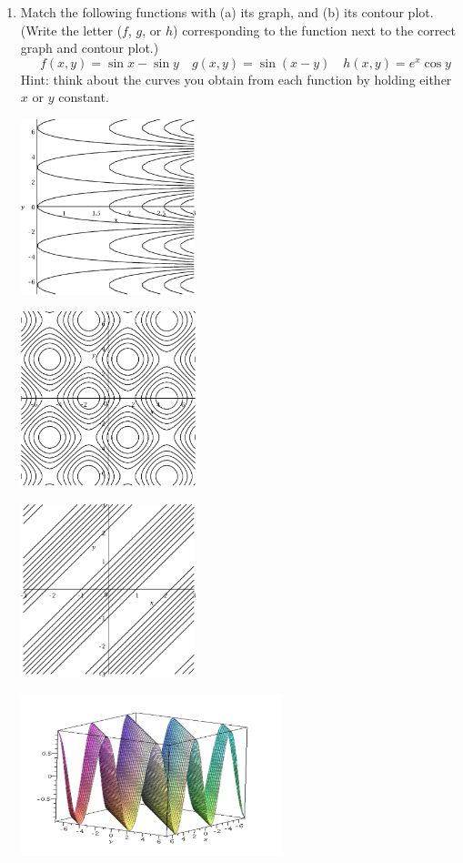 \documentclass[12pt]{article}
\newcommand{\points}[1]{\marginpar{\hspace{24pt}[#1]}}
\begin{document}
\begin{enumerate}
\item Match the following functions with (a) its graph, and (b) its contour plot. (Write the letter ($f$, $g$, or $h$) corresponding to the function next to the correct graph and contour plot.)\points{6}
\[
 \quad f(x,y) = \sin x-\sin y \quad g(x,y) = \sin(x-y) \quad h(x,y) = e^x\cos y 
\]
Hint: think about the curves you obtain from each function by holding either $x$ or $y$ constant.

\begin{multicols}{2}
 \includegraphics[width=2in]{T1ccont}

 \includegraphics[width=2in]{T1dcont}

 \includegraphics[width=2in]{T1bcont}

\columnbreak

 \includegraphics[width=3in]{T1bsurf}


\end{multicols}
\end{enumerate}
\end{document}

